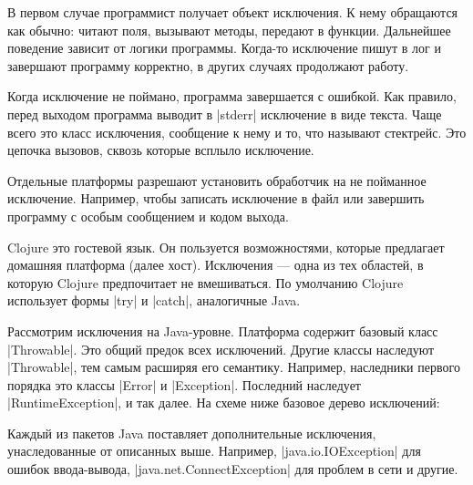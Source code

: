В первом случае программист получает объект исключения. К нему обращаются как
обычно: читают поля, вызывают методы, передают в функции. Дальнейшее поведение
зависит от логики программы. Когда-то исключение пишут в лог и завершают
программу корректно, в других случаях продолжают работу.

Когда исключение не поймано, программа завершается с ошибкой. Как правило, перед
выходом программа выводит в \spverb|stderr| исключение в виде текста. Чаще всего это
класс исключения, сообщение к нему и то, что называют стектрейс. Это цепочка
вызовов, сквозь которые всплыло исключение.

Отдельные платформы разрешают установить обработчик на не пойманное
исключение. Например, чтобы записать исключение в файл или завершить программу с
особым сообщением и кодом выхода.

Clojure это гостевой язык. Он пользуется возможностями, которые предлагает
домашняя платформа (далее хост). Исключения — одна из тех областей, в которую
Clojure предпочитает не вмешиваться. По умолчанию Clojure использует формы \spverb|try|
и \spverb|catch|, аналогичные Java.

Рассмотрим исключения на Java-уровне. Платформа содержит базовый класс
\spverb|Throwable|. Это общий предок всех исключений. Другие классы наследуют
\spverb|Throwable|, тем самым расширяя его семантику. Например, наследники первого
порядка это классы \spverb|Error| и \spverb|Exception|. Последний наследует
\spverb|RuntimeException|, и так далее. На схеме ниже базовое дерево исключений:


Каждый из пакетов Java поставляет дополнительные исключения, унаследованные от
описанных выше. Например, \spverb|java.io.IOException| для ошибок ввода-вывода,
\spverb|java.net.ConnectException| для проблем в сети и другие.

